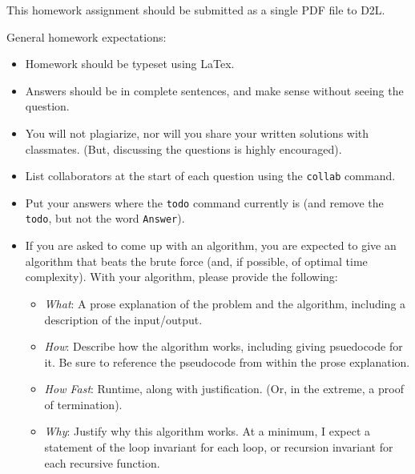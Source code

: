 This homework assignment should be submitted as a single PDF file to D2L.

General homework expectations:
\begin{itemize}
    \item Homework should be typeset using LaTex.
    \item Answers should be in complete sentences, and make sense without
        seeing the question.
    \item You will not plagiarize, nor will you share your written solutions
        with classmates.  (But, discussing the questions is highly encouraged).
    \item List collaborators at the start of each question using the
        \texttt{collab} command.
    \item Put your answers where the \texttt{todo} command currently is (and
        remove the \texttt{todo}, but not the word \texttt{Answer}).
    \item If you are asked to come up with an algorithm, you are
        expected to give an algorithm that beats the brute force (and, if possible, of
        optimal time complexity). With your algorithm, please provide the following:
        \begin{itemize}
            \item \emph{What}: A prose explanation of the problem and the algorithm,
                including a description of the input/output.
            \item \emph{How}: Describe how the algorithm works, including giving
                psuedocode for it.  Be sure to reference the pseudocode
                from within the prose explanation.
            \item \emph{How Fast}: Runtime, along with justification.  (Or, in the
                extreme, a proof of termination).
            \item \emph{Why}: Justify why this algorithm works.  At a minimum, I
                expect a statement of the loop invariant for each loop, or
                recursion invariant for each recursive function.
        \end{itemize}
\end{itemize}
